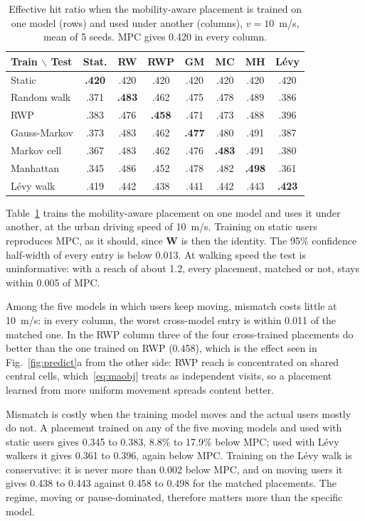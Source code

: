 \begin{table}[t]
\centering
\caption{Effective hit ratio when the mobility-aware placement is trained on one model (rows) and used under another (columns), $v=10$~m/s, mean of 5 seeds. MPC gives 0.420 in every column.}
\label{tab:mismatch}
\footnotesize
\renewcommand{\arraystretch}{1.1}
\setlength{\tabcolsep}{2.6pt}
\begin{tabular}{lccccccc}
\hline
Train $\backslash$ Test & Stat. & RW & RWP & GM & MC & MH & L\'evy \\
\hline
Static & \textbf{.420} & .420 & .420 & .420 & .420 & .420 & .420 \\
Random walk & .371 & \textbf{.483} & .462 & .475 & .478 & .489 & .386 \\
RWP & .383 & .476 & \textbf{.458} & .471 & .473 & .488 & .396 \\
Gauss-Markov & .373 & .483 & .462 & \textbf{.477} & .480 & .491 & .387 \\
Markov cell & .367 & .483 & .462 & .476 & \textbf{.483} & .491 & .380 \\
Manhattan & .345 & .486 & .452 & .478 & .482 & \textbf{.498} & .361 \\
L\'evy walk & .419 & .442 & .438 & .441 & .442 & .443 & \textbf{.423} \\
\hline
\end{tabular}
\end{table}

Table~\ref{tab:mismatch} trains the mobility-aware placement on one model and uses it under another, at the urban driving speed of 10~m/s. Training on static users reproduces MPC, as it should, since $\mathbf{W}$ is then the identity. The 95\% confidence half-width of every entry is below 0.013. At walking speed the test is uninformative: with a reach of about 1.2, every placement, matched or not, stays within 0.005 of MPC.

Among the five models in which users keep moving, mismatch costs little at 10~m/s: in every column, the worst cross-model entry is within 0.011 of the matched one. In the RWP column three of the four cross-trained placements do better than the one trained on RWP (0.458), which is the effect seen in Fig.~\ref{fig:predict}a from the other side: RWP reach is concentrated on shared central cells, which~\eqref{eq:maobj} treats as independent visits, so a placement learned from more uniform movement spreads content better.

Mismatch is costly when the training model moves and the actual users mostly do not. A placement trained on any of the five moving models and used with static users gives 0.345 to 0.383, 8.8\% to 17.9\% below MPC; used with L\'evy walkers it gives 0.361 to 0.396, again below MPC. Training on the L\'evy walk is conservative: it is never more than 0.002 below MPC, and on moving users it gives 0.438 to 0.443 against 0.458 to 0.498 for the matched placements. The regime, moving or pause-dominated, therefore matters more than the specific model.

